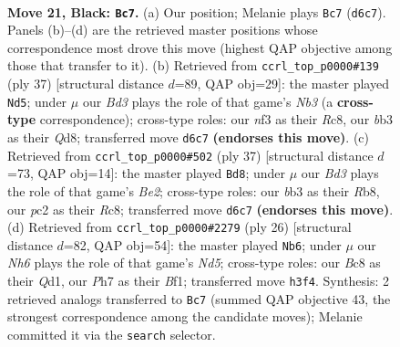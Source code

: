 \documentclass[11pt]{article}
\begin{document}
\clearpage

\begin{figure}[p]\centering
\begin{subfigure}{0.46\textwidth}\centering
\resizebox{\linewidth}{!}{%
\newchessgame
\chessboard[
  setfen={r1bq1rk1/pp5p/3b1pp1/3p4/7P/1B1P1NPn/PPPB1PK1/R2QR3 b - - 2 21},
  showmover=false,
  pgfstyle=straightmove, color=movearrow, markmove={d6-c7}
]}
\caption{}
\end{subfigure}\hfill
\begin{subfigure}{0.46\textwidth}\centering
\resizebox{\linewidth}{!}{%
\newchessgame
\chessboard[
  setfen={2rqr1k1/p3ppb1/1np3p1/5b1p/3PNB2/1P4PP/P2Q1PB1/2RR2K1 b - - 0 19},
  showmover=false,
  pgfstyle=straightmove, color=movearrow, markmove={b6-d5}
]}
\caption{}
\end{subfigure}
\\[4pt]
\begin{subfigure}{0.46\textwidth}\centering
\resizebox{\linewidth}{!}{%
\newchessgame
\chessboard[
  setfen={1rr3k1/2q1bpp1/p2p1n1p/4p3/2b1P3/2N1BB1P/1PP2PP1/RR2Q1K1 b - - 1 19},
  showmover=false,
  pgfstyle=straightmove, color=movearrow, markmove={e7-d8}
]}
\caption{}
\end{subfigure}\hfill
\begin{subfigure}{0.46\textwidth}\centering
\resizebox{\linewidth}{!}{%
\newchessgame
\chessboard[
  setfen={r2q1b1r/3p1kpp/p1b1ppn1/3N4/2p1P3/4B3/PP3PPP/R2QRBK1 w - - 0 14},
  showmover=false,
  pgfstyle=straightmove, color=movearrow, markmove={d5-b6}
]}
\caption{}
\end{subfigure}
\caption{\textbf{Move 21, Black: \texttt{Bc7}.} (a) Our position; Melanie plays \texttt{Bc7} (\texttt{d6c7}). Panels (b)--(d) are the retrieved master positions whose correspondence most drove this move (highest QAP objective among those that transfer to it). (b) Retrieved from \texttt{ccrl\_top\_p0000\#139} (ply 37) [structural distance $d$=89, QAP obj=29]: the master played \texttt{Nd5}; under $\mu$ our \emph{Bd3} plays the role of that game's \emph{Nb3} (a \textbf{cross-type} correspondence); cross-type roles: our \emph{n}f3 as their \emph{R}c8, our \emph{b}b3 as their \emph{Q}d8; transferred move \texttt{d6c7} \textbf{(endorses this move)}. (c) Retrieved from \texttt{ccrl\_top\_p0000\#502} (ply 37) [structural distance $d$=73, QAP obj=14]: the master played \texttt{Bd8}; under $\mu$ our \emph{Bd3} plays the role of that game's \emph{Be2}; cross-type roles: our \emph{b}b3 as their \emph{R}b8, our \emph{p}c2 as their \emph{R}c8; transferred move \texttt{d6c7} \textbf{(endorses this move)}. (d) Retrieved from \texttt{ccrl\_top\_p0000\#2279} (ply 26) [structural distance $d$=82, QAP obj=54]: the master played \texttt{Nb6}; under $\mu$ our \emph{Nh6} plays the role of that game's \emph{Nd5}; cross-type roles: our \emph{B}c8 as their \emph{Q}d1, our \emph{P}h7 as their \emph{B}f1; transferred move \texttt{h3f4}. Synthesis: 2 retrieved analogs transferred to \texttt{Bc7} (summed QAP objective 43, the strongest correspondence among the candidate moves); Melanie committed it via the \texttt{search} selector.}
\label{fig:thought-m41}
\end{figure}
\end{document}
